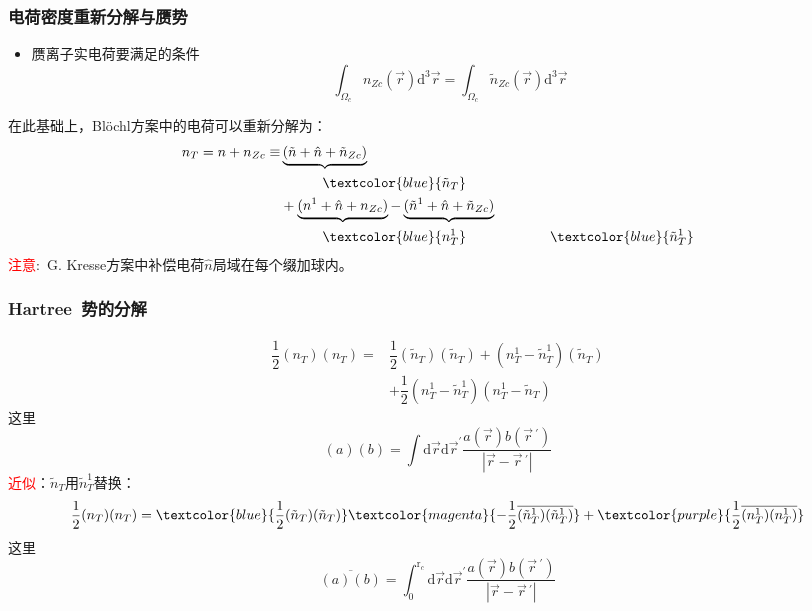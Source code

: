 {\frame
{
	\frametitle{电荷密度重新分解与赝势}
\begin{itemize}
	\item 赝离子实电荷要满足的条件$$\int_{\Omega_c}n_{Zc}(\vec r)\mathrm{d}^3\vec r=\int_{\Omega_c}\tilde n_{Zc}(\vec r)\mathrm{d}^3\vec r$$
\end{itemize}
在此基础上，\textrm{Bl\"ochl}方案中的电荷可以重新分解为：
\begin{displaymath}
	\begin{aligned}
		n_T=n+n_{Zc}\equiv&\underbrace{(\tilde n+\hat n+\tilde n_{Zc})}\\
		&\quad\qquad\textcolor{blue}{\tilde n_T}\\
				  &+\underbrace{(n^1+\hat n+n_{Zc})}-\underbrace{(\tilde n^1+\hat n+\tilde n_{Zc})}\\
				  &\quad\qquad \textcolor{blue}{n_T^1}\qquad\qquad\qquad\textcolor{blue}{\tilde n_T^1}
	\end{aligned}
\end{displaymath}
\textcolor{red}{注意}:~\textrm{G. Kresse}方案中补偿电荷$\hat n$局域在每个缀加球内。
}

\frame
{
	\frametitle{\textrm{Hartree~}势的分解}
\begin{displaymath}
	\begin{aligned}
		\dfrac12(n_T)(n_T)=&\dfrac12(\tilde n_T)(\tilde n_T)+(n_T^1-\tilde n_T^1)(\tilde n_T)\\
				&+\dfrac12(n_T^1-\tilde n_T^1)(n_T^1-\tilde n_T)
	\end{aligned}
\end{displaymath}
这里$$(a)(b)=\int\mathrm{d}\vec r\mathrm{d}\vec r^{\prime}\dfrac{a(\vec r)b(\vec r\,^{\prime})}{|\vec r-\vec r\,^{\prime}|}$$
\textcolor{red}{近似}：$\tilde n_T$用$\tilde n_T^1$替换：
\begin{displaymath}
	\dfrac12(n_T)(n_T)=\textcolor{blue}{\dfrac12(\tilde n_T)(\tilde n_T)}\textcolor{magenta}{-\dfrac12\overline{(\tilde n_T^1)(\tilde n_T^1)}}+\textcolor{purple}{\dfrac12\overline{(n_T^1)(n_T^1)}}
\end{displaymath}
这里$$\overline{(a)(b)}=\int_0^{\mathrm{r}_c}\mathrm{d}\vec r\mathrm{d}\vec r^{\prime}\dfrac{a(\vec r)b(\vec r\,^{\prime})}{|\vec r-\vec r\,^{\prime}|}$$
}

}
